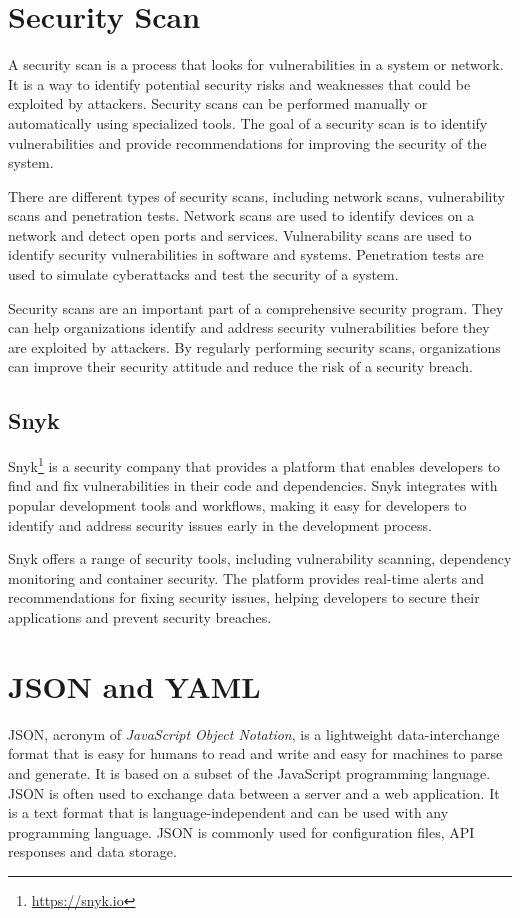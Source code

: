 \section{Security Scan}

A security scan is a process that looks for vulnerabilities in a system or network. It is a way to identify potential security risks and weaknesses that could be exploited by attackers. Security scans can be performed manually or automatically using specialized tools. The goal of a security scan is to identify vulnerabilities and provide recommendations for improving the security of the system.

There are different types of security scans, including network scans, vulnerability scans and penetration tests. Network scans are used to identify devices on a network and detect open ports and services. Vulnerability scans are used to identify security vulnerabilities in software and systems. Penetration tests are used to simulate cyberattacks and test the security of a system.

Security scans are an important part of a comprehensive security program. They can help organizations identify and address security vulnerabilities before they are exploited by attackers. By regularly performing security scans, organizations can improve their security attitude and reduce the risk of a security breach.

\subsection{Snyk}

Snyk\footnote{\url{https://snyk.io}} is a security company that provides a platform that enables developers to find and fix vulnerabilities in their code and dependencies. Snyk integrates with popular development tools and workflows, making it easy for developers to identify and address security issues early in the development process.

Snyk offers a range of security tools, including vulnerability scanning, dependency monitoring and container security. The platform provides real-time alerts and recommendations for fixing security issues, helping developers to secure their applications and prevent security breaches.

\section{JSON and YAML}

JSON, acronym of \textit{JavaScript Object Notation}, is a lightweight data-interchange format that is easy for humans to read and write and easy for machines to parse and generate. It is based on a subset of the JavaScript programming language. JSON is often used to exchange data between a server and a web application. It is a text format that is language-independent and can be used with any programming language. JSON is commonly used for configuration files, API responses and data storage.

